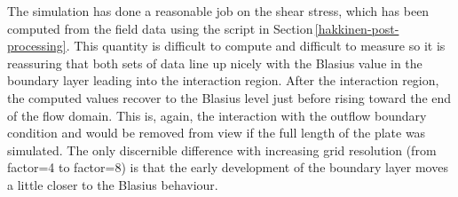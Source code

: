\medskip
The simulation has done a reasonable job on the shear stress,
which has been computed from the field data using the script in Section\,\ref{hakkinen-post-processing}.
This quantity is difficult to compute and difficult to measure so it is reassuring that both
sets of data line up nicely with the Blasius value in the boundary layer leading into the interaction region.
After the interaction region, the computed values recover to the Blasius level 
just before rising toward the end of the flow domain.
This is, again, the interaction with the outflow boundary condition and would be removed from view
if the full length of the plate was simulated.
The only discernible difference with increasing grid resolution (from factor=4 to factor=8) is that
the early development of the boundary layer moves a little closer to the Blasius behaviour.

